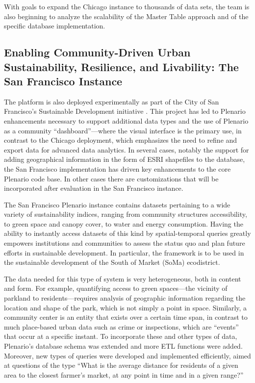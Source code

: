 \documentclass[11pt]{article}
\begin{document}
With goals to expand the Chicago instance to thousands of data sets, the team is also beginning to analyze the scalability of the Master Table approach and of the specific database implementation.

\subsection{\textbf{Enabling Community-Driven Urban Sustainability, Resilience, and Livability: The San Francisco Instance}}\label{san-francisco-instance}
The platform is also deployed experimentally as part of the City of San Francisco's Sustainable Development initiative \cite{sf-sustainable-systems}. This project has led to Plenario enhancements necessary to support additional data types and the use of Plenario as a community ``dashboard''---where the visual interface is the primary use, in contrast to the Chicago deployment, which emphasizes the need to refine and export data for advanced data analytics. In several cases, notably the support for adding geographical information in the form of ESRI shapefiles to the database, the San Francisco implementation has driven key enhancements to the core Plenario code base. In other cases there are customizations that will be incorporated after evaluation in the San Francisco instance.

The San Francisco Plenario instance contains datasets pertaining to a wide variety of sustainability indices, ranging from community structures accessibility, to green space and canopy cover, to water and energy consumption. Having the ability to instantly access datasets of this kind by spatial-temporal queries greatly empowers institutions and communities to assess the status quo and plan future efforts in sustainable development. In particular, the framework is to be used in the sustainable development of the South of Market (SoMa) ecodistrict.

The data needed for this type of system is very heterogeneous, both in content and form. For example, quantifying access to green spaces---the vicinity of parkland to residents---requires analysis of geographic information regarding the location and shape of the park, which is not simply a point in space. Similarly, a community center is an entity that exists over a certain time span, in contrast to much place-based urban data such as crime or inspections, which are ``events'' that occur at a specific instant. To incorporate these and other types of data, Plenario's database schema was extended and more ETL functions were added. Moreover, new types of queries were developed and implemented efficiently, aimed at questions of the type ``What is the average distance for residents of a given area to the closest farmer's market, at any point in time and in a given range?''
\end{document}
